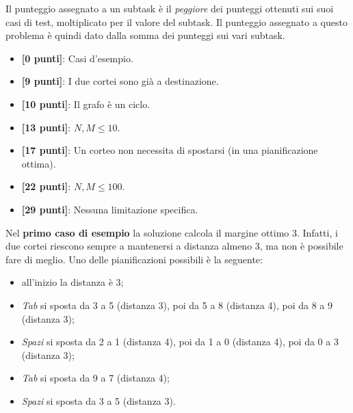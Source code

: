 Il punteggio assegnato a un subtask \`e il \emph{peggiore} dei punteggi ottenuti sui suoi casi di test, moltiplicato per il valore del subtask.
Il punteggio assegnato a questo problema \`e quindi dato dalla somma dei punteggi sui vari subtask.

\begin{itemize}[nolistsep,itemsep=2mm]
  \item \textbf{ [\phantom{0}0 punti]}: Casi d'esempio.
  \item \textbf{ [\phantom{0}9 punti]}: I due cortei sono già a destinazione.
  \item \textbf{ [10 punti]}: Il grafo è un ciclo.
  \item \textbf{ [13 punti]}: $N, M \leq 10$.
  \item \textbf{ [17 punti]}: Un corteo non necessita di spostarsi (in una pianificazione ottima).
  \item \textbf{ [22 punti]}: $N, M \leq 100$.
  \item \textbf{ [29 punti]}: Nessuna limitazione specifica.
\end{itemize}



\Examples

\begin{example}
%
%
\end{example}



\Explanation

Nel \textbf{primo caso di esempio} la soluzione calcola il margine ottimo $3$.
Infatti, i due cortei riescono sempre a mantenersi a distanza almeno $3$,
ma non è possibile fare di meglio.
Uno delle pianificazioni possibili è la seguente:

\begin{itemize}
 \item all'inizio la distanza è 3;
 \item \emph{Tab} si sposta da 3 a 5 (distanza 3), poi da 5 a 8 (distanza 4), poi da 8 a 9 (distanza 3);
 \item \emph{Spazi} si sposta da 2 a 1 (distanza 4), poi da 1 a 0 (distanza 4), poi da 0 a 3 (distanza 3);
 \item \emph{Tab} si sposta da 9 a 7 (distanza 4);
 \item \emph{Spazi} si sposta da 3 a 5 (distanza 3).
\end{itemize}

